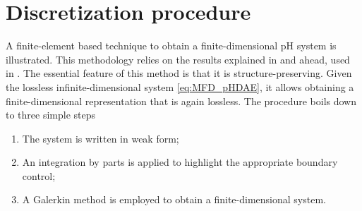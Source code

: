 \documentclass{svjour3}                     %
\begin{document}
\section{Discretization procedure}
\label{sec:discr}
A finite-element based technique to obtain a finite-dimensional pH system is illustrated. This methodology relies on the results explained in \cite{cardoso2019partitioned} and ahead, used in \cite{BRUGNOLI2019940,BRUGNOLI2019961}. The essential feature of this method is that it is structure-preserving. Given the lossless infinite-dimensional system \eqref{eq:MFD_pHDAE}, it allows obtaining a finite-dimensional representation that is again lossless. The procedure boils down to three simple steps
\begin{enumerate}
	\item The system is written in weak form; 
	\item An integration by parts is applied to highlight the appropriate boundary control;
	\item A Galerkin method is employed to obtain a finite-dimensional system.
\end{enumerate}
\end{document}
